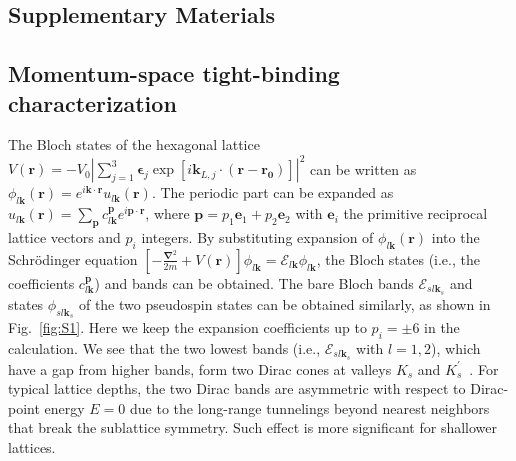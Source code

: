 \documentclass[twocolumn,english,prl,floatfix,citeautoscript,nofootinbib]{revtex4}
\begin{document}
\begin{widetext}
\setcounter{figure}{0} \renewcommand{\thefigure}{S\arabic{figure}} %
\setcounter{equation}{0} \renewcommand{\theequation}{S\arabic{equation}}

\section{Supplementary Materials}

\subsection{Momentum-space tight-binding characterization}

The Bloch states of the hexagonal lattice $V(\mathbf{r})=-V_{0}|%
\sum_{j=1}^{3}\mathbf{\epsilon }_{j}\exp [i\mathbf{k}_{L,j}\cdot (\mathbf{r}-%
\mathbf{r_{0}})]|^{2}$ can be written as $\phi _{l\mathbf{k}}(\mathbf{r}%
)=e^{i\mathbf{k}\cdot \mathbf{r}}u_{l\mathbf{k}}(\mathbf{r})$. The periodic
part can be expanded as $u_{l\mathbf{k}}(\mathbf{r})=\sum_{\mathbf{p}}c_{l%
\mathbf{k}}^{\mathbf{p}}e^{i\mathbf{p}\cdot \mathbf{r}}$, where $\mathbf{p}%
=p_{1}\mathbf{e}_{1}+p_{2}\mathbf{e}_{2}$ with $\mathbf{e}_{i}$ the
primitive reciprocal lattice vectors and $p_{i}$ integers. By substituting
expansion of $\phi _{l\mathbf{k}}(\mathbf{r})$ into the Schr\"{o}dinger
equation $[-\frac{\mathbf{\nabla }^{2}}{2m}+V(\mathbf{r})]\phi _{l\mathbf{k}%
}=\mathcal{E}_{l\mathbf{k}}\phi _{l\mathbf{k}}$, the Bloch states (i.e., the
coefficients $c_{l\mathbf{k}}^{\mathbf{p}}$) and bands can be obtained. The
bare Bloch bands $\mathcal{E}_{sl\mathbf{k}_{s}}$ and states $\phi _{sl%
\mathbf{k}_{s}}$ of the two pseudospin states can be obtained similarly, as
shown in Fig.~\ref{fig:S1}. Here we keep the expansion coefficients up to $%
p_{i}=\pm 6$ in the calculation. We see that the two lowest bands (i.e., $%
\mathcal{E}_{sl\mathbf{k}_{s}}$ with $l=1,2$), which have a gap from higher
bands, form two Dirac cones at valleys $K_{s}$ and $K_{s}^{\prime }$~\cite%
{science.aad5812S}. For typical lattice depths, the two Dirac bands are
asymmetric with respect to Dirac-point energy $E=0$ due to the long-range
tunnelings beyond nearest neighbors that break the sublattice symmetry. Such
effect is more significant for shallower lattices.


\end{widetext}
\end{document}
